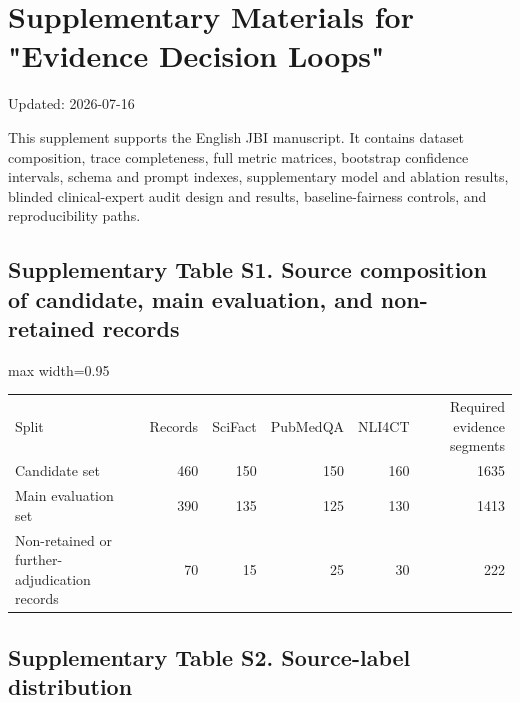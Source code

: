 \documentclass[
  8pt,
]{extarticle}
\author{}
\date{}
\begin{document}
\hypertarget{supplementary-materials-for-evidence-decision-loops}{%
\section{Supplementary Materials for "Evidence Decision
Loops"}\label{supplementary-materials-for-evidence-decision-loops}}

Updated: 2026-07-16

This supplement supports the English JBI manuscript. It contains dataset
composition, trace completeness, full metric matrices, bootstrap
confidence intervals, schema and prompt indexes, supplementary model and
ablation results, blinded clinical-expert audit design and results,
baseline-fairness controls, and reproducibility paths.

\hypertarget{supplementary-table-s1-source-composition-of-candidate-main-evaluation-and-non-retained-records}{%
\subsection{Supplementary Table S1. Source composition of candidate,
main evaluation, and non-retained
records}\label{supplementary-table-s1-source-composition-of-candidate-main-evaluation-and-non-retained-records}}

\begin{center}
\begin{adjustbox}{max width=0.95\textwidth}
\begin{tabular}{@{}
lrrrrr@{}}
\toprule\noalign{}
Split & Records & SciFact & PubMedQA & NLI4CT & Required evidence
segments \\

Candidate set & 460 & 150 & 150 & 160 & 1635 \\
Main evaluation set & 390 & 135 & 125 & 130 & 1413 \\
Non-retained or further-adjudication records & 70 & 15 & 25 & 30 &
222 \\
\bottomrule
\end{tabular}
\end{adjustbox}
\end{center}

\hypertarget{supplementary-table-s2-source-label-distribution}{%
\subsection{Supplementary Table S2. Source-label
distribution}\label{supplementary-table-s2-source-label-distribution}}
\end{document}

